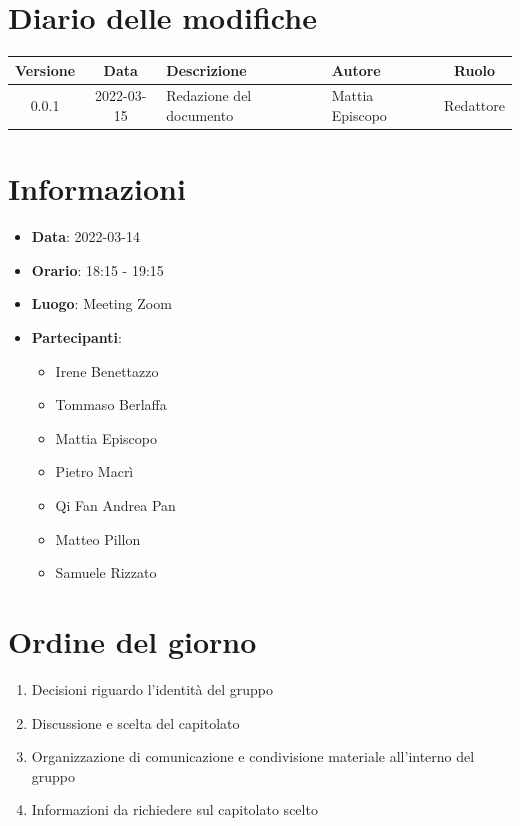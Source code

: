 \documentclass[12pt, a4paper,table]{article}
\begin{document}
	\section*{Diario delle modifiche}
	\begin{center}
	\begin{tabular}{ |c|c|m{9em}|m{5em}|c| }
	\hline
	\textbf{Versione} & \textbf{Data} & \textbf{Descrizione} &  \textbf{Autore} &  \textbf{Ruolo} \\
	\hline
	0.0.1 & 2022-03-15 & Redazione del documento & Mattia Episcopo & Redattore\\
	\hline
	\end{tabular}
	\end{center}
	\newpage
	\tableofcontents
	\newpage
	\section{Informazioni}
	\begin{itemize}
		\item \textbf{Data}: 2022-03-14
		\item \textbf{Orario}: 18:15 - 19:15
		\item \textbf{Luogo}: Meeting Zoom
		\item \textbf{Partecipanti}:
		\begin{itemize}
			\item Irene Benettazzo
			\item Tommaso Berlaffa
			\item Mattia Episcopo
			\item Pietro Macrì
			\item Qi Fan Andrea Pan
			\item Matteo Pillon
			\item Samuele Rizzato
		\end{itemize}
	\end{itemize}
	\section{Ordine del giorno}
	\begin{enumerate}
		\item Decisioni riguardo l'identità del gruppo
		\item Discussione e scelta del capitolato
		\item Organizzazione di comunicazione e condivisione materiale all'interno del gruppo
		\item Informazioni da richiedere sul capitolato scelto
	\end{enumerate}
	\newpage
\end{document}
